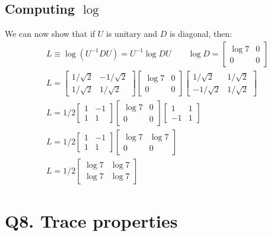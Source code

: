 \documentclass[11pt]{book}
\begin{document}
 \subsection{Computing $\log$}
 We can now show that if $U$ is unitary and $D$ is diagonal, then:
 \begin{align*}
     &L \equiv \log(U^{-1} D U) = U^{-1} \log D U 
     \qquad \log D = \begin{bmatrix} \log 7 & 0 \\ 0 & 0 \end{bmatrix} \\
    &L  =\begin{bmatrix}
         1/\sqrt 2 & -1 / \sqrt 2 \\ 1/\sqrt 2 & 1/\sqrt 2
     \end{bmatrix}
     \begin{bmatrix}\log 7 & 0 \\ 0 & 0 \end{bmatrix} 
     \begin{bmatrix}
         1/\sqrt 2 & 1/\sqrt 2 \\ -1/ \sqrt 2 & 1/\sqrt 2
     \end{bmatrix} \\
     &L = 1/2 \begin{bmatrix} 1 & -1 \\ 1 & 1 \end{bmatrix} 
     \begin{bmatrix} \log 7 & 0 \\ 0 & 0 \end{bmatrix}
     \begin{bmatrix} 1 & 1 \\ -1 & 1 \end{bmatrix} \\
   &L = 1/2 \begin{bmatrix} 1 & -1 \\ 1 & 1 \end{bmatrix}  \begin{bmatrix} \log 7 & \log 7 \\ 0 & 0\end{bmatrix} \\
   &L = 1/2 \begin{bmatrix} \log 7 & \log 7 \\ \log 7 & \log 7 \end{bmatrix}
 \end{align*}

\section{Q8. Trace properties}
\end{document}

